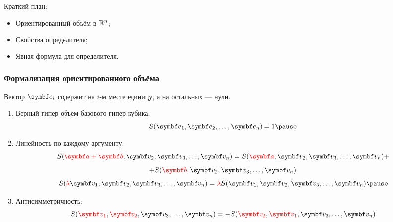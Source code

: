 
\begin{frame} %


\end{frame}



\begin{frame}{Краткий план:}
  \begin{itemize}[<+->]
    \item Ориентированный объём в $\mathbb{R}^n$;
    \item Свойства определителя;
    \item Явная формула для определителя.
  \end{itemize}

\end{frame}




\begin{frame}
    \frametitle{Формализация ориентированного объёма}


    Вектор $\be_i$ содержит на $i$-м месте единицу, а на остальных — нули.
    \pause

    \begin{enumerate}
        \item Верный гипер-объём базового гипер-кубика:
        \[
        S(\be_1, \be_2, \ldots, \be_n) = 1   \pause 
        \]
        \item Линейность по каждому аргументу:
        \[
            S(\red{\ba + \bb}, \bv_2, \bv_3, \ldots, \bv_n) =  S(\red{\ba}, \bv_2, \bv_3, \ldots, \bv_n) + 
        \]
        \[
            + S(\red{\bb}, \bv_2, \bv_3, \ldots, \bv_n)          
        \]
        \[
            S(\red{\lambda}\bv_1, \bv_2, \bv_3, \ldots, \bv_n) = \red{ \lambda } S(\bv_1, \bv_2, \bv_3, \ldots, \bv_n) \pause
        \]
        \item Антисимметричность: 
        \[
          S(\red{\bv_1}, \red{\bv_2}, \bv_3, \ldots, \bv_n) = - S(\red{\bv_2}, \red{\bv_1}, \bv_3, \ldots, \bv_n)  
        \]
    \end{enumerate}
\end{frame}



